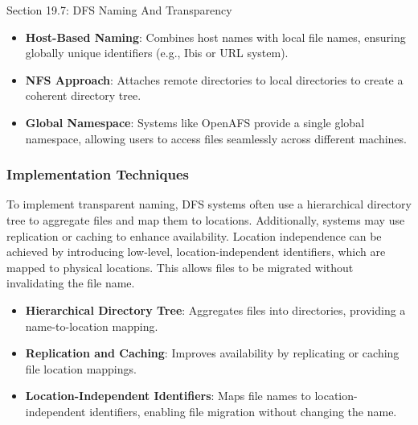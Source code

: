 \begin{notes}{Section 19.7: DFS Naming And Transparency}
\begin{highlight}
        \begin{itemize}
            \item \textbf{Host-Based Naming}: Combines host names with local file names, ensuring globally unique identifiers (e.g., Ibis or URL system).
            \item \textbf{NFS Approach}: Attaches remote directories to local directories to create a coherent directory tree.
            \item \textbf{Global Namespace}: Systems like OpenAFS provide a single global namespace, allowing users to access files seamlessly across different machines.
        \end{itemize}
    
    \end{highlight}
    
    \subsubsection*{Implementation Techniques}
    
    To implement transparent naming, DFS systems often use a hierarchical directory tree to aggregate files and map them to locations. Additionally, systems may use replication or caching to enhance 
    availability. Location independence can be achieved by introducing low-level, location-independent identifiers, which are mapped to physical locations. This allows files to be migrated without 
    invalidating the file name.
    
    \begin{highlight}
    
        \begin{itemize}
            \item \textbf{Hierarchical Directory Tree}: Aggregates files into directories, providing a name-to-location mapping.
            \item \textbf{Replication and Caching}: Improves availability by replicating or caching file location mappings.
            \item \textbf{Location-Independent Identifiers}: Maps file names to location-independent identifiers, enabling file migration without changing the name.
        \end{itemize}
    
    \end{highlight}
    
    \begin{highlight}
    

\end{highlight}
\end{notes}
